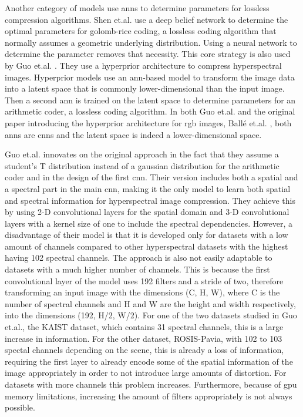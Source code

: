 Another category of models use \acp{ann} to determine parameters for lossless compression algorithms. Shen et.al. \citep{shen_golomb-rice_2017} use a deep belief network to determine the optimal parameters for golomb-rice coding, a lossless coding algorithm that normally assumes a geometric underlying distribution. Using a neural network to determine the parameter removes that necessity.
This core strategy is also used by Guo et.al. \citep{guo_learned_2021}. They use a hyperprior architecture to compress hyperspectral images. Hyperprior models use an \ac{ann}-based model to transform the image data into a latent space that is commonly lower-dimensional than the input image. Then a second \ac{ann} is trained on the latent space to determine parameters for an arithmetic coder, a lossless coding algorithm. In both Guo et.al. and the original paper introducing the hyperprior architecture for \ac{rgb} images, Ballé et.al. \citep{balle_end--end_2017}, both \acp{ann} are \acp{cnn} and the latent space is indeed a lower-dimensional space.

Guo et.al. innovates on the original approach in the fact that they assume a student's T distribution instead of a gaussian distribution for the arithmetic coder and in the design of the first \ac{cnn}. Their version includes both a spatial and a spectral part in the main \ac{cnn}, making it the only model to learn both spatial and spectral information for hyperspectral image compression. They achieve this by using 2-D convolutional layers for the spatial domain and 3-D convolutional layers with a kernel size of one to include the spectral dependencies. However, a disadvantage of their model is that it is developed only for datasets with a low amount of channels compared to other hyperspectral datasets with the highest having 102 spectral channels. The approach is also not easily adaptable to datasets with a much higher number of channels. This is because the first convolutional layer of the model uses 192 filters and a stride of two, therefore transforming an input image with the dimensions (C, H, W), where C is the number of spectral channels and H and W are the height and width respectively, into the dimensions (192, H/2, W/2). For one of the two datasets studied in Guo et.al., the KAIST dataset, which contains 31 spectral channels, this is a large increase in information. For the other dataset, ROSIS-Pavia, with 102 to 103 spectal channels depending on the scene, this is already a loss of information, requiring the first layer to already encode some of the spatial information of the image appropriately in order to not introduce large amounts of distortion. For datasets with more channels this problem increases. Furthermore, because of \ac{gpu} memory limitations, increasing the amount of filters appropriately is not always possible.

